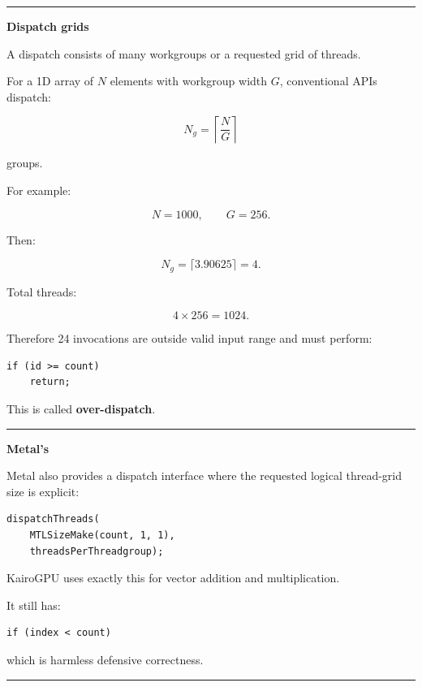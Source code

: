 \begin{center}\rule{0.5\linewidth}{0.5pt}\end{center}

\textbf{Dispatch grids}

A dispatch consists of many workgroups or a requested grid of threads.

For a 1D array of \(N\) elements with workgroup width \(G\), conventional APIs dispatch:

\[
\boxed{
N_g=
\left\lceil
\frac NG
\right\rceil
}
\]

groups.

For example:

\[
N=1000,
\qquad
G=256.
\]

Then:

\[
N_g=
\lceil3.90625\rceil
=
4.
\]

Total threads:

\[
4\times256=1024.
\]

Therefore 24 invocations are outside valid input range and must perform:

\protect{}\label{9wj2yb}%
\begin{verbatim}
if (id >= count)
    return;
\end{verbatim}

This is called \textbf{over-dispatch}.

\begin{center}\rule{0.5\linewidth}{0.5pt}\end{center}

\textbf{Metal's }

Metal also provides a dispatch interface where the requested logical thread-grid size is explicit:

\protect{}\label{d2ts06}%
\begin{verbatim}
dispatchThreads(
    MTLSizeMake(count, 1, 1),
    threadsPerThreadgroup);
\end{verbatim}

KairoGPU uses exactly this for vector addition and multiplication.

It still has:

\protect{}\label{ccmw1t}%
\begin{verbatim}
if (index < count)
\end{verbatim}

which is harmless defensive correctness.

\begin{center}\rule{0.5\linewidth}{0.5pt}\end{center}

